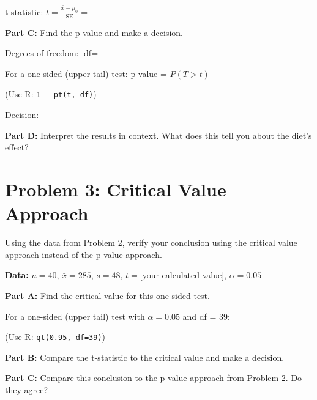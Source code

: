 \documentclass[11pt]{article}
\begin{document}
t-statistic: $t = \frac{\bar{x} - \mu_0}{\text{SE}} = $

\vspace{2cm}

\textbf{Part C:} Find the p-value and make a decision.

\vspace{0.3cm}

Degrees of freedom: $\text{df} = $

\vspace{0.5cm}

For a one-sided (upper tail) test: p-value = $P(T > t)$

(Use R: \texttt{1 - pt(t, df)})

\vspace{2cm}

Decision:

\vspace{1.5cm}

\textbf{Part D:} Interpret the results in context. What does this tell you about the diet's effect?

\vspace{3cm}

\newpage

\section{Problem 3: Critical Value Approach}

Using the data from Problem 2, verify your conclusion using the critical value approach instead of the p-value approach.

\textbf{Data:} $n=40$, $\bar{x}=285$, $s=48$, $t=$[your calculated value], $\alpha=0.05$

\vspace{6pt}

\textbf{Part A:} Find the critical value for this one-sided test.

\vspace{0.3cm}

For a one-sided (upper tail) test with $\alpha = 0.05$ and df = 39:

(Use R: \texttt{qt(0.95, df=39)})

\vspace{2cm}

\textbf{Part B:} Compare the t-statistic to the critical value and make a decision.

\vspace{3cm}

\textbf{Part C:} Compare this conclusion to the p-value approach from Problem 2. Do they agree?
\end{document}
